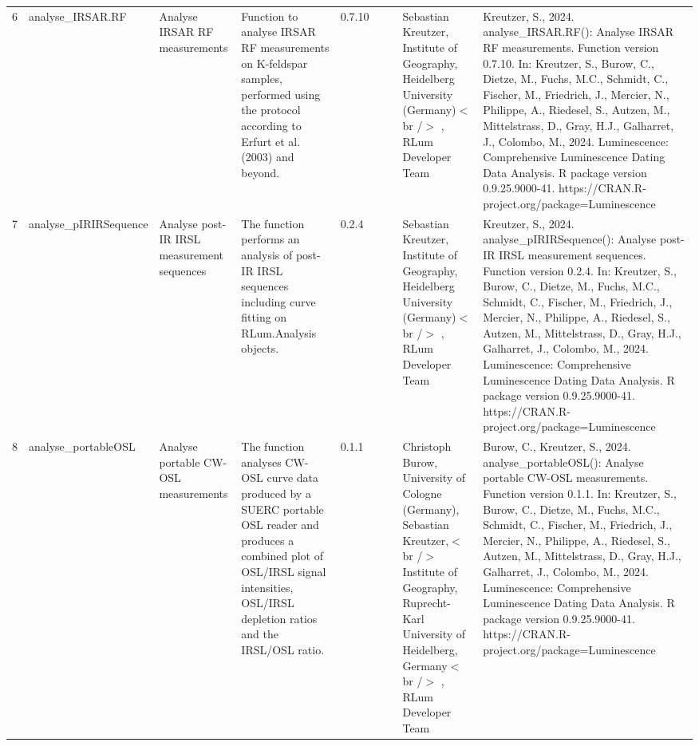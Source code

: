 \begin{table}[ht]
\begin{tabular}{rllllllll}
  6 & analyse\_IRSAR.RF & Analyse IRSAR RF measurements & Function to analyse IRSAR RF measurements on K-feldspar samples, performed using the protocol according to Erfurt et al. (2003) and beyond. & 0.7.10
 &  &  & Sebastian Kreutzer, Institute of Geography, Heidelberg University (Germany)$<$br /$>$ , RLum Developer Team & Kreutzer, S., 2024. analyse\_IRSAR.RF(): Analyse IRSAR RF measurements. Function version 0.7.10. In: Kreutzer, S., Burow, C., Dietze, M., Fuchs, M.C., Schmidt, C., Fischer, M., Friedrich, J., Mercier, N., Philippe, A., Riedesel, S., Autzen, M., Mittelstrass, D., Gray, H.J., Galharret, J., Colombo, M., 2024. Luminescence: Comprehensive Luminescence Dating Data Analysis. R package version 0.9.25.9000-41. https://CRAN.R-project.org/package=Luminescence
 \\ 
  7 & analyse\_pIRIRSequence & Analyse post-IR IRSL measurement sequences & The function performs an analysis of post-IR IRSL sequences including curve fitting on  RLum.Analysis  objects. & 0.2.4
 &  &  & Sebastian Kreutzer, Institute of Geography, Heidelberg University (Germany)$<$br /$>$ , RLum Developer Team & Kreutzer, S., 2024. analyse\_pIRIRSequence(): Analyse post-IR IRSL measurement sequences. Function version 0.2.4. In: Kreutzer, S., Burow, C., Dietze, M., Fuchs, M.C., Schmidt, C., Fischer, M., Friedrich, J., Mercier, N., Philippe, A., Riedesel, S., Autzen, M., Mittelstrass, D., Gray, H.J., Galharret, J., Colombo, M., 2024. Luminescence: Comprehensive Luminescence Dating Data Analysis. R package version 0.9.25.9000-41. https://CRAN.R-project.org/package=Luminescence
 \\ 
  8 & analyse\_portableOSL & Analyse portable CW-OSL measurements & The function analyses CW-OSL curve data produced by a SUERC portable OSL reader and produces a combined plot of OSL/IRSL signal intensities, OSL/IRSL depletion ratios and the IRSL/OSL ratio. & 0.1.1
 &  &  & Christoph Burow, University of Cologne (Germany), Sebastian Kreutzer,$<$br /$>$ Institute of Geography, Ruprecht-Karl University of Heidelberg, Germany$<$br /$>$ , RLum Developer Team & Burow, C., Kreutzer, S., 2024. analyse\_portableOSL(): Analyse portable CW-OSL measurements. Function version 0.1.1. In: Kreutzer, S., Burow, C., Dietze, M., Fuchs, M.C., Schmidt, C., Fischer, M., Friedrich, J., Mercier, N., Philippe, A., Riedesel, S., Autzen, M., Mittelstrass, D., Gray, H.J., Galharret, J., Colombo, M., 2024. Luminescence: Comprehensive Luminescence Dating Data Analysis. R package version 0.9.25.9000-41. https://CRAN.R-project.org/package=Luminescence
 \\ 

\end{tabular}
\end{table}
